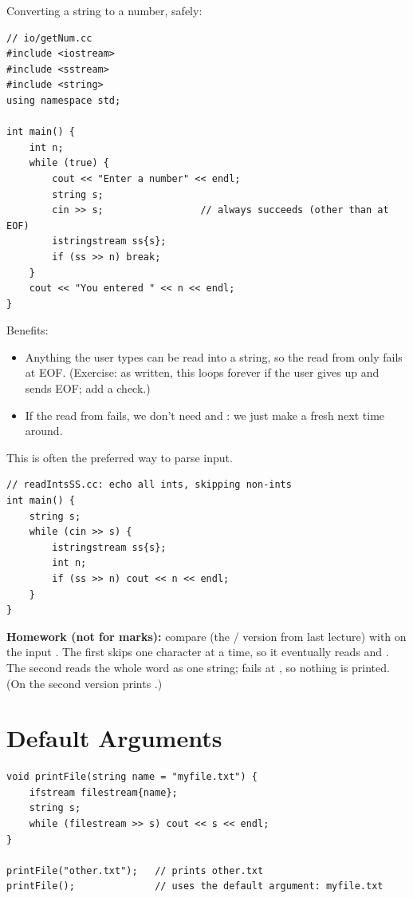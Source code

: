 Converting a string to a number, safely:
\begin{lstlisting}[style=cpp]
// io/getNum.cc
#include <iostream>
#include <sstream>
#include <string>
using namespace std;

int main() {
    int n;
    while (true) {
        cout << "Enter a number" << endl;
        string s;
        cin >> s;                 // always succeeds (other than at EOF)
        istringstream ss{s};
        if (ss >> n) break;
    }
    cout << "You entered " << n << endl;
}
\end{lstlisting}
Benefits:
\begin{itemize}
  \item Anything the user types can be read into a string, so the read from
         only fails at EOF. (Exercise: as written, this loops forever
        if the user gives up and sends EOF; add a check.)
  \item If the read from  fails, we don't need  and
        : we just make a fresh  next time around.
\end{itemize}
This is often the preferred way to parse input.

\begin{lstlisting}[style=cpp]
// readIntsSS.cc: echo all ints, skipping non-ints
int main() {
    string s;
    while (cin >> s) {
        istringstream ss{s};
        int n;
        if (ss >> n) cout << n << endl;
    }
}
\end{lstlisting}

\begin{aside}
\textbf{Homework (not for marks):} compare  (the
/ version from last lecture) with 
on the input . The first skips one character at a time, so it
eventually reads  and . The second reads the whole word
 as one string;  fails at , so
nothing is printed. (On  the second version prints .)
\end{aside}

\section{Default Arguments}
\begin{lstlisting}[style=cpp]
void printFile(string name = "myfile.txt") {
    ifstream filestream{name};
    string s;
    while (filestream >> s) cout << s << endl;
}

printFile("other.txt");   // prints other.txt
printFile();              // uses the default argument: myfile.txt
\end{lstlisting}

